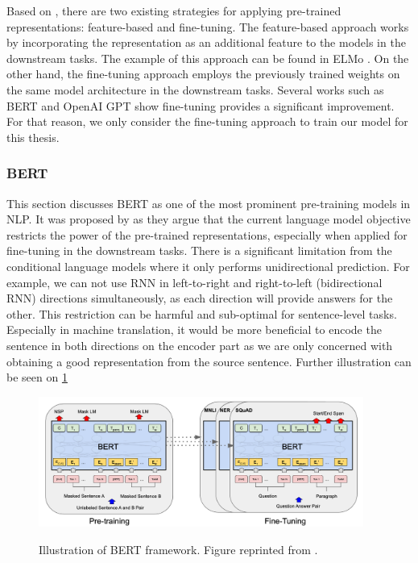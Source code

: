 Based on \cite{ruder2019transfer}, there are two existing strategies for applying pre-trained representations: feature-based and fine-tuning. The feature-based approach works by incorporating the representation as an additional feature to the models in the downstream tasks. The example of this approach can be found in ELMo \cite{Peters2018DeepCW}. On the other hand, the fine-tuning approach employs the previously trained weights on the same model architecture in the downstream tasks. Several works such as BERT \cite{devlin2018bert} and OpenAI GPT \cite{Radford2018ImprovingLU} show fine-tuning provides a significant improvement. For that reason, we only consider the fine-tuning approach to train our model for this thesis.

\subsubsection{BERT}
This section discusses BERT as one of the most prominent pre-training models in NLP. It was proposed by \cite{devlin2018bert} as they argue that the current language model objective restricts the power of the pre-trained representations, especially when applied for fine-tuning in the downstream tasks. There is a significant limitation from the conditional language models where it only performs unidirectional prediction. For example, we can not use RNN in left-to-right and right-to-left (bidirectional RNN) directions simultaneously, as each direction will provide answers for the other.
This restriction can be harmful and sub-optimal for sentence-level tasks. Especially in machine translation, it would be more beneficial to encode the sentence in both directions on the encoder part as we are only concerned with obtaining a good representation from the source sentence.
Further illustration can be seen on \ref{img:bert}

\begin{figure}[h]
    {\includegraphics[width=0.95\textwidth]{img/bert.png}}
    \centering
    \caption{Illustration of BERT framework. Figure reprinted from \cite{devlin2018bert}.}
    \label{img:bert}
\end{figure}

